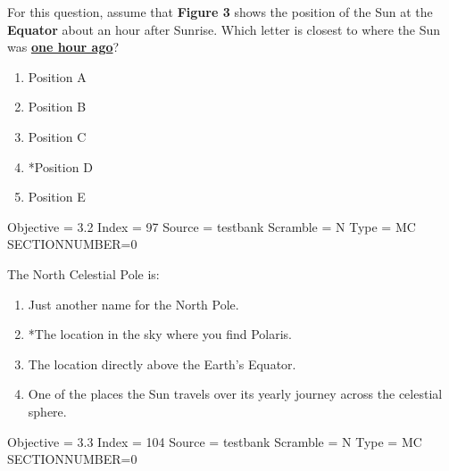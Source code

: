 \documentclass[11pt]{article}
\begin{document}
\begin{enumerate}
\begin{minipage}{\textwidth}
\begin{minipage}{\textwidth}
\item For this question, assume that {\bf Figure 3} shows the position of the Sun at the {\bf Equator} about an hour after Sunrise.   Which letter is closest to where the Sun was \underline{\bf one hour ago}?
\begin{multicols}{3}
\begin{enumerate} 
\setlength{\itemsep}{1pt} 
\setlength{\parskip}{0pt} 
\setlength{\parsep}{0pt}
\setlength{\multicolsep}{1pt} 
\item Position A
\item Position B
\item Position C
\item *Position D
\item Position E
\end{enumerate} 
\vfill 
\end{multicols}

Objective = 3.2
Index = 97
Source = testbank
Scramble = N
Type = MC
SECTIONNUMBER=0
\end{minipage}
\end{minipage}
\vskip 0.20in

\begin{minipage}{\textwidth}
\begin{minipage}{\textwidth}
\item The North Celestial Pole is:
\begin{enumerate} 
\setlength{\itemsep}{1pt} 
\setlength{\parskip}{0pt} 
\setlength{\parsep}{0pt}
\setlength{\multicolsep}{1pt} 
\item Just another name for the North Pole.
\item *The location in the sky where you find Polaris.
\item The location directly above the Earth's Equator.
\item One of the places the Sun travels over its yearly journey across the celestial sphere.
\end{enumerate} 
Objective = 3.3
Index = 104
Source = testbank
Scramble = N
Type = MC
SECTIONNUMBER=0
\end{minipage}
\end{minipage}
\vskip 0.20in


\end{enumerate}
\end{document}
